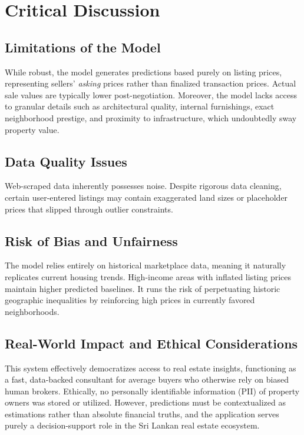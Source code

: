 \documentclass[12pt]{article}
\begin{document}
\section{Critical Discussion}

\subsection{Limitations of the Model}
While robust, the model generates predictions based purely on listing prices, representing sellers' \textit{asking} prices rather than finalized transaction prices. Actual sale values are typically lower post-negotiation. Moreover, the model lacks access to granular details such as architectural quality, internal furnishings, exact neighborhood prestige, and proximity to infrastructure, which undoubtedly sway property value.

\subsection{Data Quality Issues}
Web-scraped data inherently possesses noise. Despite rigorous data cleaning, certain user-entered listings may contain exaggerated land sizes or placeholder prices that slipped through outlier constraints.

\subsection{Risk of Bias and Unfairness}
The model relies entirely on historical marketplace data, meaning it naturally replicates current housing trends. High-income areas with inflated listing prices maintain higher predicted baselines. It runs the risk of perpetuating historic geographic inequalities by reinforcing high prices in currently favored neighborhoods.

\subsection{Real-World Impact and Ethical Considerations}
This system effectively democratizes access to real estate insights, functioning as a fast, data-backed consultant for average buyers who otherwise rely on biased human brokers. Ethically, no personally identifiable information (PII) of property owners was stored or utilized. However, predictions must be contextualized as estimations rather than absolute financial truths, and the application serves purely a decision-support role in the Sri Lankan real estate ecosystem.
\end{document}
